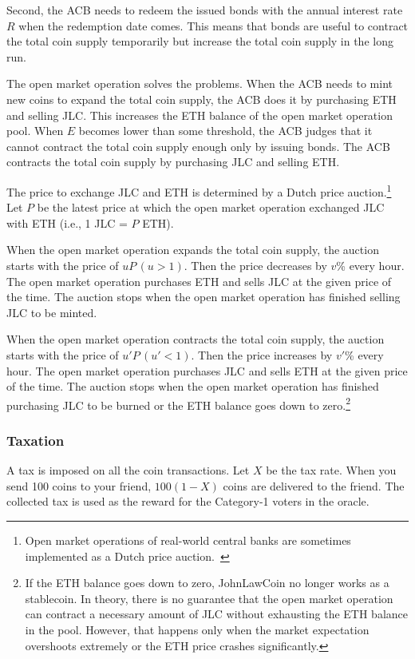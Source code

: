 \documentclass[dvipdfmx,a4paper]{article}
\begin{document}
Second, the ACB needs to redeem the issued bonds with the annual interest rate $R$ when the redemption date comes. This means that bonds are useful to contract the total coin supply temporarily but increase the total coin supply in the long run.

The open market operation solves the problems. When the ACB needs to mint new coins to expand the total coin supply, the ACB does it by purchasing ETH and selling JLC. This increases the ETH balance of the open market operation pool. When $E$ becomes lower than some threshold, the ACB judges that it cannot contract the total coin supply enough only by issuing bonds. The ACB contracts the total coin supply by purchasing JLC and selling ETH.

The price to exchange JLC and ETH is determined by a Dutch price auction.\footnote{Open market operations of real-world central banks are sometimes implemented as a Dutch price auction.~\cite{ayuso2003model}} Let $P$ be the latest price at which the open market operation exchanged JLC with ETH (i.e., 1 JLC = $P$ ETH).

When the open market operation expands the total coin supply, the auction starts with the price of $uP\,(u>1)$. Then the price decreases by $v$\% every hour. The open market operation purchases ETH and sells JLC at the given price of the time. The auction stops when the open market operation has finished selling JLC to be minted.

When the open market operation contracts the total coin supply, the auction starts with the price of $u'P\,(u'<1)$. Then the price increases by $v'$\% every hour. The open market operation purchases JLC and sells ETH at the given price of the time. The auction stops when the open market operation has finished purchasing JLC to be burned or the ETH balance goes down to zero.\footnote{If the ETH balance goes down to zero, JohnLawCoin no longer works as a stablecoin. In theory, there is no guarantee that the open market operation can contract a necessary amount of JLC without exhausting the ETH balance in the pool. However, that happens only when the market expectation overshoots extremely or the ETH price crashes significantly.}

\subsubsection{Taxation}

A tax is imposed on all the coin transactions. Let $X$ be the tax rate. When you send 100 coins to your friend, $100(1-X)$ coins are delivered to the friend. The collected tax is used as the reward for the Category-1 voters in the oracle.
\end{document}
